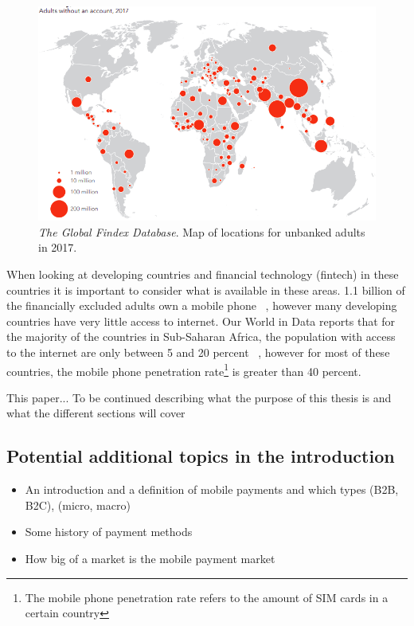 \documentclass[11pt, a4paper]{article}
\begin{document}
\begin{figure}[ht]
\centering
\includegraphics[width=1\linewidth]{figs/unbanked_map}
\caption{\textit{The Global Findex Database}. Map of locations for unbanked adults in 2017.}
\label{fig: unbanked_map}
\end{figure}


When looking at developing countries and financial technology (fintech) in these countries it is important to consider what is available in these areas. 1.1 billion of the financially excluded adults own a mobile phone ~\cite{gfindex}, however many developing countries have very little access to internet. Our World in Data reports that for the majority of the countries in Sub-Saharan Africa, the population with access to the internet are only between 5 and 20 percent ~\cite{owidinternet}, however for most of these countries, the mobile phone penetration rate\footnote{The mobile phone penetration rate refers to the amount of SIM cards in a certain country} is greater than 40 percent. ~\cite{owidinternet}

This paper... {\color{purple}To be continued describing what the purpose of this thesis is and what the different sections will cover}

\subsection{Potential additional topics in the introduction}
\begin{itemize}
    \item {\color{purple} An introduction and a definition of mobile payments and which types (B2B, B2C), (micro, macro)}
    \item {\color{purple} Some history of payment methods}
    \item {\color{purple} How big of a market is the mobile payment market}
\end{itemize}
\end{document}
